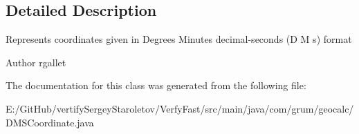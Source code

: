 \subsection{Detailed Description}
Represents coordinates given in Degrees Minutes decimal-\/seconds (D M s) format

\begin{DoxyAuthor}{Author}
rgallet 
\end{DoxyAuthor}


The documentation for this class was generated from the following file\+:\begin{DoxyCompactItemize}
\item 
E\+:/\+Git\+Hub/vertify\+Sergey\+Staroletov/\+Verfy\+Fast/src/main/java/com/grum/geocalc/D\+M\+S\+Coordinate.\+java\end{DoxyCompactItemize}
